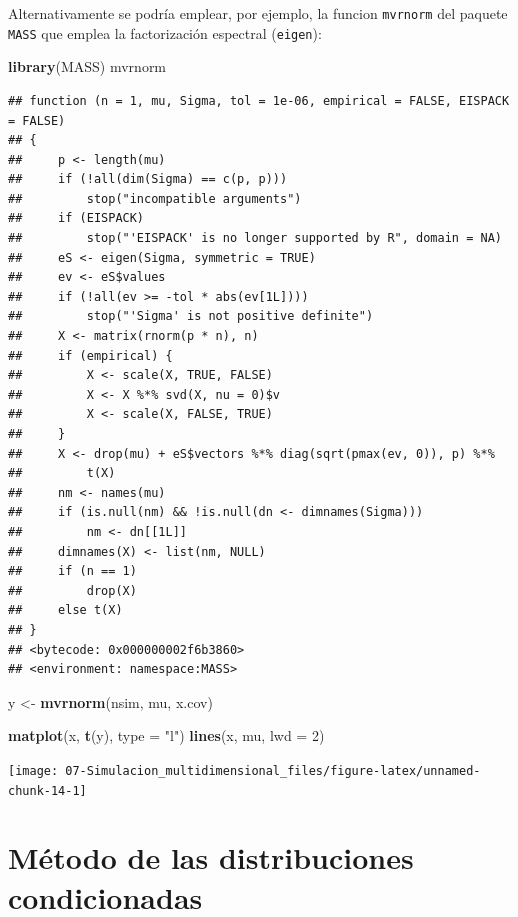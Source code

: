 \documentclass[]{book}
\newenvironment{Shaded}{\begin{snugshade}}{\end{snugshade}}
\newcommand{\KeywordTok}[1]{\textcolor[rgb]{0.13,0.29,0.53}{\textbf{#1}}}
\newcommand{\DataTypeTok}[1]{\textcolor[rgb]{0.13,0.29,0.53}{#1}}
\newcommand{\DecValTok}[1]{\textcolor[rgb]{0.00,0.00,0.81}{#1}}
\newcommand{\StringTok}[1]{\textcolor[rgb]{0.31,0.60,0.02}{#1}}
\newcommand{\NormalTok}[1]{#1}
\theoremstyle{definition}
\theoremstyle{definition}
\theoremstyle{definition}
\theoremstyle{remark}
\begin{document}
Alternativamente se podría emplear, por ejemplo, la funcion
\texttt{mvrnorm} del paquete \texttt{MASS} que emplea la factorización
espectral (\texttt{eigen}):

\begin{Shaded}
\begin{Highlighting}[]
\KeywordTok{library}\NormalTok{(MASS)}
\NormalTok{mvrnorm}
\end{Highlighting}
\end{Shaded}

\begin{verbatim}
## function (n = 1, mu, Sigma, tol = 1e-06, empirical = FALSE, EISPACK = FALSE) 
## {
##     p <- length(mu)
##     if (!all(dim(Sigma) == c(p, p))) 
##         stop("incompatible arguments")
##     if (EISPACK) 
##         stop("'EISPACK' is no longer supported by R", domain = NA)
##     eS <- eigen(Sigma, symmetric = TRUE)
##     ev <- eS$values
##     if (!all(ev >= -tol * abs(ev[1L]))) 
##         stop("'Sigma' is not positive definite")
##     X <- matrix(rnorm(p * n), n)
##     if (empirical) {
##         X <- scale(X, TRUE, FALSE)
##         X <- X %*% svd(X, nu = 0)$v
##         X <- scale(X, FALSE, TRUE)
##     }
##     X <- drop(mu) + eS$vectors %*% diag(sqrt(pmax(ev, 0)), p) %*% 
##         t(X)
##     nm <- names(mu)
##     if (is.null(nm) && !is.null(dn <- dimnames(Sigma))) 
##         nm <- dn[[1L]]
##     dimnames(X) <- list(nm, NULL)
##     if (n == 1) 
##         drop(X)
##     else t(X)
## }
## <bytecode: 0x000000002f6b3860>
## <environment: namespace:MASS>
\end{verbatim}

\begin{Shaded}
\begin{Highlighting}[]
\NormalTok{y <-}\StringTok{ }\KeywordTok{mvrnorm}\NormalTok{(nsim, mu, x.cov)}

\KeywordTok{matplot}\NormalTok{(x, }\KeywordTok{t}\NormalTok{(y), }\DataTypeTok{type =} \StringTok{"l"}\NormalTok{)}
\KeywordTok{lines}\NormalTok{(x, mu, }\DataTypeTok{lwd =} \DecValTok{2}\NormalTok{)}
\end{Highlighting}
\end{Shaded}

\begin{center}\texttt{[image: 07-Simulacion\_multidimensional\_files/figure-latex/unnamed-chunk-14-1]} \end{center}

\section{Método de las distribuciones
condicionadas}\label{metodo-de-las-distribuciones-condicionadas}
\end{document}
